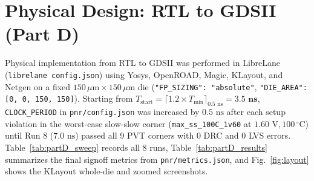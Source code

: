 \documentclass[conference,10pt]{IEEEtran}
\begin{document}
\section{Physical Design: RTL to GDSII (Part D)}
Physical implementation from RTL to GDSII was performed in LibreLane (\texttt{librelane config.json}) using Yosys, OpenROAD, Magic, KLayout, and Netgen on a fixed $150\,\mu\text{m} \times 150\,\mu\text{m}$ die (\texttt{"FP\_SIZING": "absolute"}, \texttt{"DIE\_AREA": [0, 0, 150, 150]}). Starting from $T_{\text{start}} = \lceil 1.2 \times T_{\min} \rceil_{0.5\text{ ns}} = \mathbf{3.5\text{ ns}}$, \texttt{CLOCK\_PERIOD} in \texttt{pnr/config.json} was increased by $0.5\text{ ns}$ after each setup violation in the worst-case slow-slow corner (\texttt{max\_ss\_100C\_1v60} at $1.60\text{ V}, 100\,^\circ\text{C}$) until Run 8 ($7.0\text{ ns}$) passed all 9 PVT corners with 0 DRC and 0 LVS errors. Table~\ref{tab:partD_sweep} records all 8 runs, Table~\ref{tab:partD_results} summarizes the final signoff metrics from \texttt{pnr/metrics.json}, and Fig.~\ref{fig:layout} shows the KLayout whole-die and zoomed screenshots.
\end{document}

